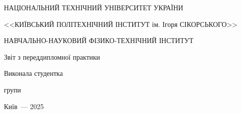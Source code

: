 \thispagestyle{empty}

\begin{center}
НАЦІОНАЛЬНИЙ ТЕХНІЧНИЙ УНІВЕРСИТЕТ УКРАЇНИ \par
<<КИЇВСЬКИЙ ПОЛІТЕХНІЧНИЙ ІНСТИТУТ ім. Ігоря СІКОРСЬКОГО>>\par
НАВЧАЛЬНО-НАУКОВИЙ ФІЗИКО-ТЕХНІЧНИЙ ІНСТИТУТ\par

\vspace{40mm}
{\huge Звіт з переддипломної практики\par}

\huge\MakeUppercase{\textbf{\reportTitle}} \par
\end{center}

\vspace{40mm}
\begin{flushright}
Виконала студентка

групи \reportAuthorGroup

\reportAuthor


\end{flushright}

\vspace{50mm}
\begin{center}
{Київ~--- 2025}
\end{center}

\newpage
\thispagestyle{plain}
